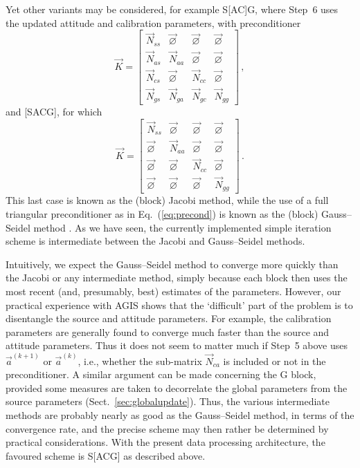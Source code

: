 \documentclass[structabstract]{aa}
\begin{document}
Yet other variants may be considered, for example S[AC]G, where Step~6 uses the
updated attitude and calibration parameters, with preconditioner
\begin{equation}\label{eq:precondS(CA)G}
\vec{K} =
    \begin{bmatrix}
        \vec{N}_{ss} & \vec{\varnothing} & \vec{\varnothing} & \vec{\varnothing} \\
        \vec{N}_{as} & \vec{N}_{aa}      & \vec{\varnothing} & \vec{\varnothing} \\
        \vec{N}_{cs} & \vec{\varnothing} & \vec{N}_{cc}      & \vec{\varnothing} \\
        \vec{N}_{gs} & \vec{N}_{ga}      & \vec{N}_{gc}      & \vec{N}_{gg}
    \end{bmatrix} \, ,
\end{equation}
and [SACG], for which
\begin{equation}\label{eq:precond(SCAG)}
\vec{K} =
    \begin{bmatrix}
        \vec{N}_{ss}      & \vec{\varnothing} & \vec{\varnothing} & \vec{\varnothing} \\
        \vec{\varnothing} & \vec{N}_{aa}      & \vec{\varnothing} & \vec{\varnothing} \\
        \vec{\varnothing} & \vec{\varnothing} & \vec{N}_{cc}      & \vec{\varnothing} \\
        \vec{\varnothing} & \vec{\varnothing} & \vec{\varnothing} & \vec{N}_{gg}
    \end{bmatrix} \, .
\end{equation}
This last case is known as the (block) Jacobi method, while the use of a full triangular
preconditioner as in Eq.~(\ref{eq:precond}) is known as the (block) Gauss--Seidel method
\citep{axelsson96}. As we have seen, the currently implemented simple iteration scheme
is intermediate between the Jacobi and Gauss--Seidel methods.

Intuitively, we expect the Gauss--Seidel method to converge more quickly than the Jacobi
or any intermediate method, simply because each block then uses the most recent (and,
presumably, best) estimates of the parameters. However, our practical experience with
AGIS shows that the `difficult' part of the problem is to disentangle the source and
attitude parameters. For example, the calibration parameters are generally found to
converge much faster than the source and attitude parameters. Thus it does not seem to
matter much if Step~5 above uses $\vec{a}^{(k+1)}$ or $\vec{a}^{(k)}$, i.e., whether
the sub-matrix $\vec{N}_{ca}$ is included or not in the preconditioner. A similar
argument can be made concerning the G block, provided some measures are taken to
decorrelate the global parameters from the source parameters 
(Sect.~\ref{sec:globalupdate}). Thus, the various intermediate methods are 
probably nearly as good as the Gauss--Seidel
method, in terms of the convergence rate, and the precise scheme may then rather be
determined by practical considerations. With the present data processing architecture,
the favoured scheme is S[ACG] as described above.
\end{document}
